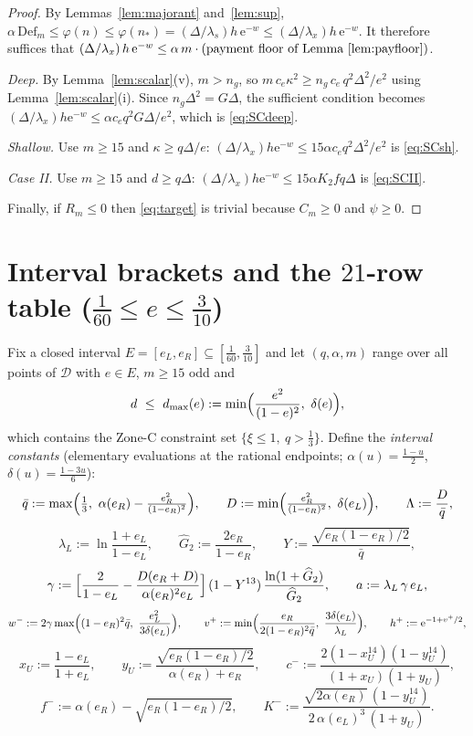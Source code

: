 \documentclass[11pt]{amsart}
\newcommand{\eu}{\mathrm{e}}
\newcommand{\D}{\mathcal D}
\begin{document}
\begin{proof}
By Lemmas~\ref{lem:majorant} and~\ref{lem:sup},
$\alpha\,\mathrm{Def}_m\le\varphi(n)\le\varphi(n_*)
=(\Delta/\lambda_s)h\,\eu^{-w}\le(\Delta/\lambda_x)h\,\eu^{-w}$.
It therefore suffices that
$(\Delta/\lambda_x)\,h\,\eu^{-w}\le\alpha\,m\cdot(\text{payment floor of
Lemma~\ref{lem:payfloor}})$.

\emph{Deep.}  By Lemma~\ref{lem:scalar}(v), $m>n_g$, so
$m\,c_e\kappa^2\ge n_g\,c_e\,q^2\Delta^2/e^2$ using
Lemma~\ref{lem:scalar}(i).  Since $n_g\Delta^2=G\Delta$, the sufficient
condition becomes
$(\Delta/\lambda_x)h\eu^{-w}\le\alpha c_eq^2G\Delta/e^2$, which is
\eqref{eq:SCdeep}.

\emph{Shallow.}  Use $m\ge15$ and $\kappa\ge q\Delta/e$:
$(\Delta/\lambda_x)h\eu^{-w}\le15\alpha c_eq^2\Delta^2/e^2$ is
\eqref{eq:SCsh}.

\emph{Case II.}  Use $m\ge15$ and $d\ge q\Delta$:
$(\Delta/\lambda_x)h\eu^{-w}\le15\alpha K_2fq\Delta$ is \eqref{eq:SCII}.

Finally, if $R_m\le0$ then \eqref{eq:target} is trivial because
$C_m\ge0$ and $\psi\ge0$.
\end{proof}

\section{Interval brackets and the $21$-row table
($\tfrac1{60}\le e\le\tfrac3{10}$)}\label{sec:table}

Fix a closed interval $E=[e_L,e_R]\subseteq[\tfrac1{60},\tfrac3{10}]$ and let
$(q,\alpha,m)$ range over all points of $\D$ with $e\in E$, $m\ge15$ odd and
\begin{equation}\label{eq:dcap}
 d\ \le\ d_{\max}(e):=\min\Bigl(\frac{e^2}{(1-e)^2},\ \delta(e)\Bigr),
\end{equation}
which contains the Zone-C constraint set $\{\xi\le1,\ q>\tfrac13\}$.
Define the \emph{interval constants} (elementary evaluations at the rational
endpoints; $\alpha(u)=\tfrac{1-u}2$, $\delta(u)=\tfrac{1-3u}6$):
\[
 \bar q:=\max\Bigl(\tfrac13,\ \alpha(e_R)-\tfrac{e_R^2}{(1-e_R)^2}\Bigr),
 \qquad
 D:=\min\Bigl(\tfrac{e_R^2}{(1-e_R)^2},\ \delta(e_L)\Bigr),
 \qquad
 \Lambda:=\frac D{\bar q},
\]
\[
 \lambda_L:=\ln\frac{1+e_L}{1-e_L},\qquad
 \widehat G_2:=\frac{2e_R}{1-e_R},\qquad
 Y:=\frac{\sqrt{e_R(1-e_R)/2}}{\bar q},
\]
\[
 \gamma:=\Bigl[\frac2{1-e_L}-\frac{D(e_R+D)}{\alpha(e_R)^2e_L}\Bigr]
 \,(1-Y^{13})\,\frac{\ln(1+\widehat G_2)}{\widehat G_2},
 \qquad
 a:=\lambda_L\,\gamma\,e_L,
\]
\[
 w^-:=2\gamma\max\Bigl((1-e_R)^2\bar q,\ \frac{e_L^2}{3\delta(e_L)}\Bigr),
 \qquad
 v^+:=\min\Bigl(\frac{e_R}{2(1-e_R)^2\bar q},\ \frac{3\delta(e_L)}{\lambda_L}
 \Bigr),\qquad
 h^+:=\eu^{-1+v^+/2},
\]
\[
 x_U:=\frac{1-e_L}{1+e_L},\qquad
 y_U:=\frac{\sqrt{e_R(1-e_R)/2}}{\alpha(e_R)+e_R},\qquad
 c^-:=\frac{2(1-x_U^{14})(1-y_U^{14})}{(1+x_U)(1+y_U)},
\]
\[
 f^-:=\alpha(e_R)-\sqrt{e_R(1-e_R)/2},\qquad
 K^-:=\frac{\sqrt{2\alpha(e_R)}\,(1-y_U^{14})}{2\,\alpha(e_L)^3\,(1+y_U)}.
\]
\end{document}
